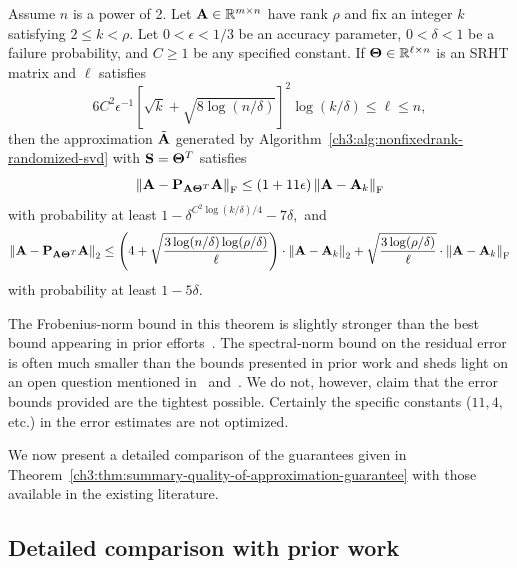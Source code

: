 \begin{thm}
\label{ch3:thm:summary-quality-of-approximation-guarantee}
Assume $n$ is a power of 2. Let $\mathbf{A} \in \mathbb{R}^{m \times n}$ have rank $\rho$ and fix an integer $k$ satisfying $ 2 \leq k < \rho$. Let $0 < \epsilon < 1/3$
be an accuracy parameter, $0 < \delta < 1$ be a failure probability, and $C \ge 1$ be any specified constant. If $\mathbf{\Theta} \in \mathbb{R}^{\ell \times n}$
is an SRHT matrix and $\ell$ satisfies
\begin{equation}\label{ch3:eqn:rsummary}
 6 C^2 \epsilon^{-1} \left[\sqrt{k} + \sqrt{8\log(n/\delta)} \right]^2 \log(k/\delta) \leq \ell \leq n,
\end{equation}
then the approximation $\tilde{\mathbf{A}}$ generated by Algorithm~\ref{ch3:alg:nonfixedrank-randomized-svd} with $\mathbf{S} = \mathbf{\Theta}^T$ satisfies
\[
 \left\|\mathbf{A} - \mathbf{P}_{\mathbf{A}\mathbf{\Theta}^T}\mathbf{A}\right\|_\mathrm{F} \leq (1 + 11\epsilon) \left\|\mathbf{A} - \mathbf{A}_k\right\|_\mathrm{F}
\]
with probability at least $1 - \delta^{C^2 \log(k/\delta)/4} - 7\delta,$ and
\[
 \left\|\mathbf{A} - \mathbf{P}_{\mathbf{A}\mathbf{\Theta}^T}\mathbf{A}\right\|_2 \leq \left(4 +
 \sqrt{\frac{3 \log(n/\delta)\log(\rho/\delta)}{\ell}} \right) \cdot \left\|\mathbf{A} - \mathbf{A}_k\right\|_2 +
 \sqrt{\frac{3 \log(\rho/\delta)}{\ell}} \cdot \left\|\mathbf{A} - \mathbf{A}_k\right\|_\mathrm{F}
\]
with probability at least $1-5 \delta.$
\end{thm}


The Frobenius-norm bound in this theorem is slightly
stronger than the best bound appearing in prior efforts~\cite{NDT09}.
The spectral-norm bound on the residual error is often much smaller than the 
bounds presented in prior work and sheds light on an open question mentioned in~\cite{NDT09}
and~\cite{HMT11}.
We do not, however, claim that the error bounds provided are the tightest 
possible. Certainly the specific constants ($11,4,$ etc.) in the error estimates are not optimized.

We now present a detailed comparison of the guarantees given in 
Theorem~\ref{ch3:thm:summary-quality-of-approximation-guarantee} with those available 
in the existing literature.

\subsection{Detailed comparison with prior work}
\label{ch3:sec:priorwork}

